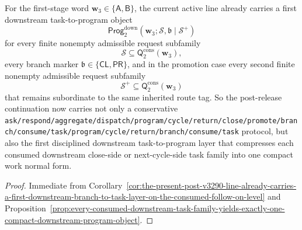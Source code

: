 \begin{corollary}
\label{cor:the-present-post-v3290-line-already-carries-a-first-downstream-task-to-program-layer-on-the-consumed-follow-on-level}
For the first-stage word \(\mathbf w_3\in\{\mathsf A,\mathsf B\}\), the current active line already carries a first downstream task-to-program object
\[
 \mathsf{Prog}^{\mathrm{down}}_{2}(\mathbf w_3;\mathcal S,\mathfrak b\mid\mathcal S^{+})
\]
for every finite nonempty admissible request subfamily
\[
 \mathcal S\subseteq \mathsf{Q}^{\mathrm{cons}}_{2}(\mathbf w_3),
\]
every branch marker \(\mathfrak b\in\{\mathsf{CL},\mathsf{PR}\}\), and in the promotion case every second finite nonempty admissible request subfamily
\[
 \mathcal S^{+}\subseteq \mathsf{Q}^{\mathrm{cons}}_{2}(\mathbf w_3)
\]
that remains subordinate to the same inherited route tag. So the post-release continuation now carries not only a conservative {\nolinkurl{ask/respond/aggregate/dispatch/program/cycle/return/close/promote/branch/consume/task/program/cycle/return/branch/consume/task}} protocol, but also the first disciplined downstream task-to-program layer that compresses each consumed downstream close-side or next-cycle-side task family into one compact work normal form.
\end{corollary}

\begin{proof}
Immediate from Corollary~\ref{cor:the-present-post-v3290-line-already-carries-a-first-downstream-branch-to-task-layer-on-the-consumed-follow-on-level} and Proposition~\ref{prop:every-consumed-downstream-task-family-yields-exactly-one-compact-downstream-program-object}.
\end{proof}

